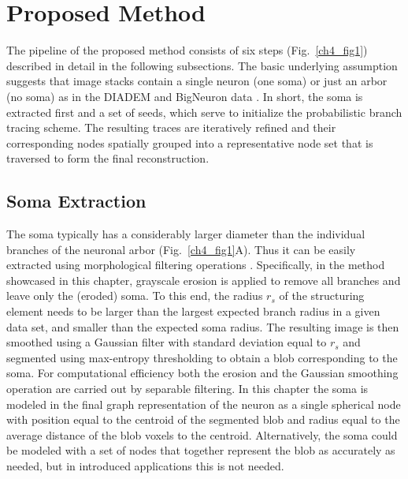 \section{Proposed Method}
\label{sec:method}

The pipeline of the proposed method consists of six steps (Fig.~\ref{ch4_fig1}) described in detail in the following subsections. The basic underlying assumption suggests that image stacks contain a single neuron (one soma) or just an arbor (no soma) as in the DIADEM \cite{brown2011diadem} and BigNeuron data \cite{peng2015bigneuron}. In short, the soma is extracted first and a set of seeds, which serve to initialize the probabilistic branch tracing scheme. The resulting traces are iteratively refined and their corresponding nodes spatially grouped into a representative node set that is traversed to form the final reconstruction.

\subsection{Soma Extraction}
\label{subsec:soma-extraction}
The soma typically has a considerably larger diameter than the individual branches of the neuronal arbor (Fig.~\ref{ch4_fig1}A). Thus it can be easily extracted using morphological filtering operations \cite{yan2013automated}. Specifically, in the method showcased in this chapter, grayscale erosion is applied to remove all branches and leave only the (eroded) soma. To this end, the radius $r_s$ of the structuring element needs to be larger than the largest expected branch radius in a given data set, and smaller than the expected soma radius. The resulting image is then smoothed using a Gaussian filter with standard deviation equal to $r_s$ and segmented using max-entropy thresholding \cite{radojevic2016fuzzy} to obtain a blob corresponding to the soma. For computational efficiency both the erosion and the Gaussian smoothing operation are carried out by separable filtering. In this chapter the soma is modeled in the final graph representation of the neuron as a single spherical node with position equal to the centroid of the segmented blob and radius equal to the average distance of the blob voxels to the centroid. Alternatively, the soma could be modeled with a set of nodes that together represent the blob as accurately as needed, but in introduced applications this is not needed.

